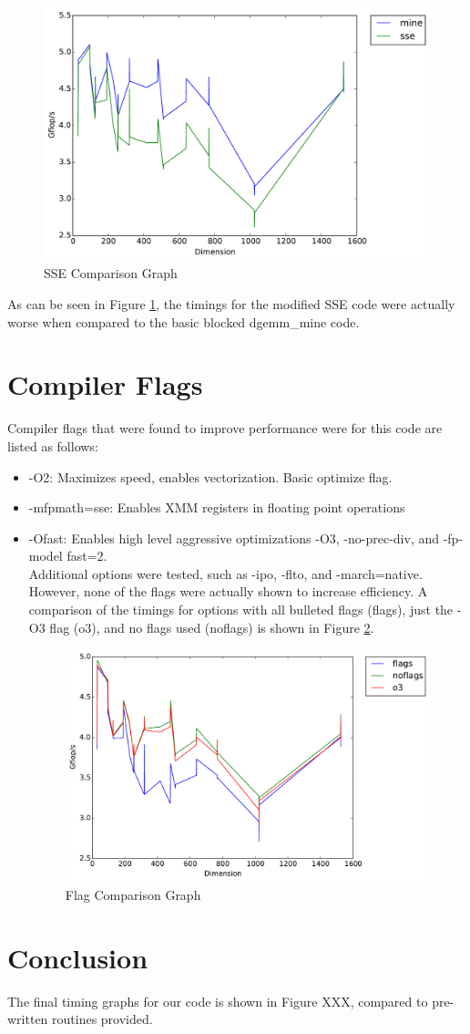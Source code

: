 \documentclass[letterpaper]{article}	 %
\begin{document}
\begin{figure}[H]
\centering
  \centering
  \includegraphics[width=.6\linewidth]{timing_sse.pdf}
  \caption{SSE Comparison Graph}
  \label{fig:sse}
  \end{figure}
  
  As can be seen in Figure \ref{fig:sse}, the timings for the modified SSE code were actually worse when compared to the basic blocked dgemm\_mine code. 


\section{Compiler Flags}
Compiler flags that were found to improve performance were for this code are listed as follows: \\
\begin{itemize}
\item -O2: Maximizes speed, enables vectorization. Basic optimize flag. 
\item -mfpmath=sse: Enables XMM registers in floating point operations
\item -Ofast: Enables high level aggressive optimizations -O3, -no-prec-div, and -fp-model fast=2. 
\\ 

Additional options were tested, such as -ipo, -flto, and -march=native. However, none of the flags were actually shown to increase efficiency. A comparison of the timings for options with all bulleted flags (flags), just the -O3 flag (o3), and no flags used (noflags) is shown in Figure \ref{fig:flags}. 

\begin{figure}[H]
\centering
  \centering
  \includegraphics[width=.6\linewidth]{timing_flagcompare.pdf}
  \caption{Flag Comparison Graph}
  \label{fig:flags}
  \end{figure}

\end{itemize}

\section{Conclusion}

The final timing graphs for our code is shown in Figure XXX, compared to pre-written routines provided.

\end{document}
